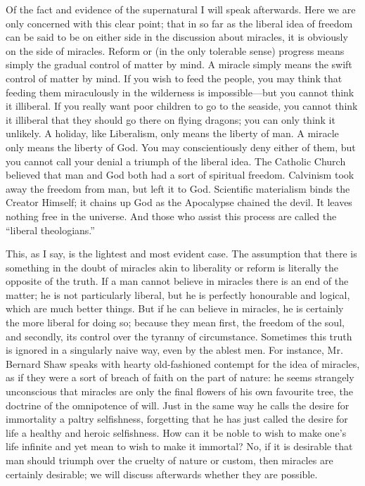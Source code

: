 Of the fact and evidence of the supernatural I will speak afterwards. Here we are only concerned with this clear point; that in so far as the liberal idea of freedom can be said to be on either side in the discussion about miracles, it is obviously on the side of miracles. Reform or (in the only tolerable sense) progress means simply the gradual control of matter by mind. A miracle simply means the swift control of matter by mind. If you wish to feed the people, you may think that feeding them miraculously in the wilderness is impossible—but you cannot think it illiberal. If you really want poor children to go to the seaside, you cannot think it illiberal that they should go there on flying dragons; you can only think it unlikely. A holiday, like Liberalism, only means the liberty of man. A miracle only means the liberty of God. You may conscientiously deny either of them, but you cannot call your denial a triumph of the liberal idea. The Catholic Church believed that man and God both had a sort of spiritual freedom. Calvinism took away the freedom from man, but left it to God. Scientific materialism binds the Creator Himself; it chains up God as the Apocalypse chained the devil. It leaves nothing free in the universe. And those who assist this process are called the “liberal theologians.”

This, as I say, is the lightest and most evident case. The assumption that there is something in the doubt of miracles akin to liberality or reform is literally the opposite of the truth. If a man cannot believe in miracles there is an end of the matter; he is not particularly liberal, but he is perfectly honourable and logical, which are much better things. But if he can believe in miracles, he is certainly the more liberal for doing so; because they mean first, the freedom of the soul, and secondly, its control over the tyranny of circumstance. Sometimes this truth is ignored in a singularly naive way, even by the ablest men. For instance, Mr. Bernard Shaw speaks with hearty old-fashioned contempt for the idea of miracles, as if they were a sort of breach of faith on the part of nature: he seems strangely unconscious that miracles are only the final flowers of his own favourite tree, the doctrine of the omnipotence of will. Just in the same way he calls the desire for immortality a paltry selfishness, forgetting that he has just called the desire for life a healthy and heroic selfishness. How can it be noble to wish to make one’s life infinite and yet mean to wish to make it immortal? No, if it is desirable that man should triumph over the cruelty of nature or custom, then miracles are certainly desirable; we will discuss afterwards whether they are possible.

